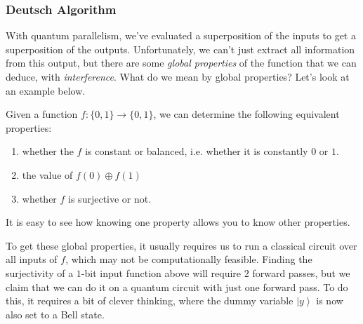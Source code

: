 \documentclass{article}
\newcommand{\ket}[1]{\ensuremath{\left|#1\right\rangle}}
\begin{document}
    \subsubsection{Deutsch Algorithm}

    With quantum parallelism, we've evaluated a superposition of the inputs to get a superposition of the outputs. Unfortunately, we can't just extract all information from this output, but there are some \textit{global properties} of the function that we can deduce, with \textit{interference}. What do we mean by global properties? Let's look at an example below. 

    \begin{example}
      Given a function $f: \{0, 1\} \longrightarrow \{0, 1\}$, we can determine the following equivalent properties: 
      \begin{enumerate} 
        \item whether the $f$ is constant or balanced, i.e. whether it is constantly $0$ or $1$.
        \item the value of $f(0) \oplus f(1)$
        \item whether $f$ is surjective or not. 
      \end{enumerate}
      It is easy to see how knowing one property allows you to know other properties. 
    \end{example}

    To get these global properties, it usually requires us to run a classical circuit over all inputs of $f$, which may not be computationally feasible. Finding the surjectivity of a $1$-bit input function above will require $2$ forward passes, but we claim that we can do it on a quantum circuit with just one forward pass. To do this, it requires a bit of clever thinking, where the dummy variable $\ket{y}$ is now also set to a Bell state. 
\end{document}
